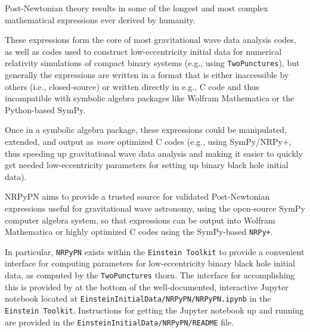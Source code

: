 \newenvironment{packed_enumerate}{
\begin{enumerate}
  \setlength{\itemsep}{0.0pt}
  \setlength{\parskip}{0.0pt}
  \setlength{\parsep}{ 0.0pt}
}{\end{enumerate}}

Post-Newtonian theory results in some of the longest and most complex
mathematical expressions ever derived by humanity.

These expressions form the core of most gravitational wave data
analysis codes, as well as codes used to construct low-eccentricity
initial data for numerical relativity simulations of compact binary
systems (e.g., using \texttt{TwoPunctures}), but generally the
expressions are written in a format 
that is either inaccessible by others (i.e., closed-source) or written
directly in e.g., C code and thus incompatible with symbolic algebra
packages like Wolfram Mathematica or the
Python-based SymPy.

Once in a symbolic algebra package, these expressions could be
manipulated, extended, and output as {\it more} optimized C codes
(e.g., using SymPy/NRPy+, thus speeding up gravitational wave data
analysis and making it easier to quickly get needed low-eccentricity
parameters for setting up binary black hole initial data).

NRPyPN aims to provide a trusted source for validated
Post-Newtonian expressions useful for gravitational wave astronomy,
using the open-source SymPy computer algebra
system, so that expressions can be output into Wolfram
Mathematica or highly optimized C codes using the SymPy-based
\texttt{NRPy+}.

In particular, \texttt{NRPyPN} exists within the \texttt{Einstein
  Toolkit} to provide a convenient interface for computing
parameters for low-eccentricity binary black hole initial data, as
computed by the \texttt{TwoPunctures} thorn. The interface for
accomplishing this is provided by at the bottom of the
well-documented, interactive Jupyter notebook located at
\texttt{EinsteinInitialData/NRPyPN/NRPyPN.ipynb} in the
\texttt{Einstein Toolkit}. Instructions for getting the Jupyter
notebook up and running are provided in the
\texttt{EinsteinInitialData/NRPyPN/README} file.




